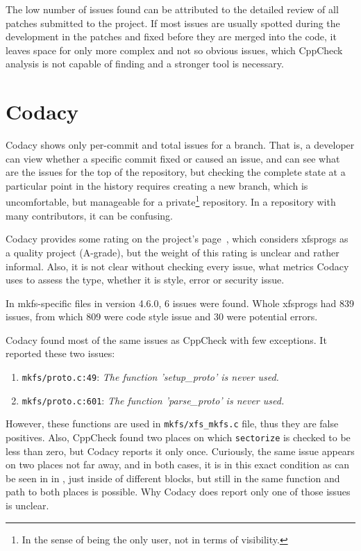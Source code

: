The low number of issues found can be attributed to the detailed review of all
patches submitted to the project. If most issues are usually spotted during the
development in the patches and fixed before they are merged into the code, it
leaves space for only more complex and not so obvious issues, which CppCheck
analysis is not capable of finding and a stronger tool is necessary.

\section{Codacy}\label{chap:results:codacy}
Codacy shows only per-commit and total issues for a branch. That is, a
developer can view whether a specific commit fixed or caused an issue, and
can see what are the issues for the top of the repository, but checking the
complete state at a particular point in the history requires creating a new
branch, which is uncomfortable, but manageable for a private\footnote{In
the sense of being the only user, not in terms of visibility.} repository.
In a repository with many contributors, it can be confusing.

Codacy provides some rating on the project's page~\cite{codacyXfsprogs},
which considers xfsprogs as a quality project (A-grade), but the weight of
this rating is unclear and rather informal. Also, it is not clear without
checking every issue, what metrics Codacy uses to assess the type, whether
it is style, error or security issue.

In mkfs-specific files in version 4.6.0, 6 issues were found. Whole
xfsprogs had 839 issues, from which 809 were code style issue and 30 were
potential errors.

Codacy found most of the same issues as CppCheck with few exceptions. It
reported these two issues:
\begin{enumerate}
	\item {\tt mkfs/proto.c:49}: {\em The function 'setup\_proto' is
		never used.}
	\item {\tt mkfs/proto.c:601}: {\em The function 'parse\_proto' is
		never used.}
\end{enumerate}

However, these functions are used in {\tt mkfs/xfs\_mkfs.c} file, thus they are
false positives. Also, CppCheck found two places on which {\tt sectorize} is
checked to be less than zero, but Codacy reports it only once. Curiously, the
same issue appears on two places not far away, and in both cases, it is in this
exact condition as can be seen in  in
, just inside of different blocks, but still in the
same function and path to both places is possible. Why Codacy does report only
one of those issues is unclear.


